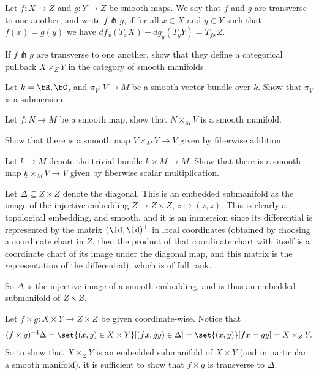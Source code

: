 \def\uk{\underline k}
\bprob

    Let $f\colon X\to Z$ and $g\colon Y\to Z$ be smooth maps.
    We say that $f$ and $g$ are {\emphcolor transverse} to one another, and write $f\pitchfork g$, if for all
    $x\in X$ and $y\in Y$ such that $f(x)=g(y)$ we have $df_x(T_xX)+dg_y(T_yY)=T_{fx}Z$.

    \benum
        \item If $f\pitchfork g$ are transverse to one another, show that they define a categorical pullback $X\times_ZY$
        in the category of smooth manifolds.
        \item Let $k=\bR,\bC$, and $\pi_V\colon V\to M$ be a smooth vector bundle over $k$.
        Show that $\pi_V$ is a submersion.
        \item Let $f\colon N\to M$ be a smooth map, show that $N\times_MV$ is a smooth manifold.
        \item Show that there is a smooth map $V\times_MV\to V$ given by fiberwise addition.
        \item Let $\uk\to M$ denote the trivial bundle $k\times M\to M$.
        Show that there is a smooth map $\uk\times_MV\to V$ given by fiberwise scalar multiplication.
    \eenum

\eprob

\benum
    \item Let $\Delta\subseteq Z\times Z$ denote the diagonal.
    This is an embedded submanifold as the image of the injective embedding $Z\to Z\times Z$, $z\mapsto(z,z)$.
    This is clearly a topological embedding, and smooth, and it is an immersion since its differential is represented by
    the matrix $(\id,\id)^\top$ in local coordinates (obtained by choosing a coordinate chart in $Z$, then the product
    of that coordinate chart with itself is a coordinate chart of its image under the diagonal map, and this matrix is the
    representation of the differential); which is of full rank.

    So $\Delta$ is the injective image of a smooth embedding, and is thus an embedded submanifold of $Z\times Z$.

    Let $f\times g\colon X\times Y\to Z\times Z$ be given coordinate-wise.
    Notice that
    $$ (f\times g)^{-1}\Delta = \set{(x,y)\in X\times Y}[(fx,gy)\in\Delta] = \set{(x,y)}[fx=gy] = X\times_ZY . $$
    So to show that $X\times_ZY$ is an embedded submanifold of $X\times Y$ (and in particular a smooth manifold), it
    is sufficient to show that $f\times g$ is transverse to $\Delta$.

